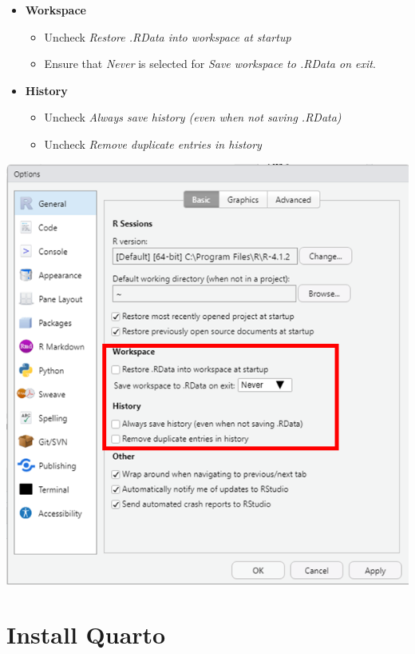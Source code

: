 \documentclass[
  letterpaper,
  DIV=11,
  numbers=noendperiod,
  oneside]{scrreprt}
\providecommand{\tightlist}{%
  \setlength{\itemsep}{0pt}\setlength{\parskip}{0pt}}\usepackage{longtable,booktabs,array}
\begin{document}
\begin{itemize}
\tightlist
\item
  \textbf{Workspace}

  \begin{itemize}
  \item
    Uncheck \emph{Restore .RData into workspace at startup}
  \item
    Ensure that \emph{Never} is selected for \emph{Save workspace to
    .RData on exit}.
  \end{itemize}
\item
  \textbf{History}

  \begin{itemize}
  \item
    Uncheck \emph{Always save history (even when not saving .RData)}
  \item
    Uncheck \emph{Remove duplicate entries in history}
  \end{itemize}
\end{itemize}

\includegraphics{./images/paste-A507B21D.png}

\hypertarget{sec-Quarto-installation}{%
\section{Install Quarto}\label{sec-Quarto-installation}}
\end{document}

